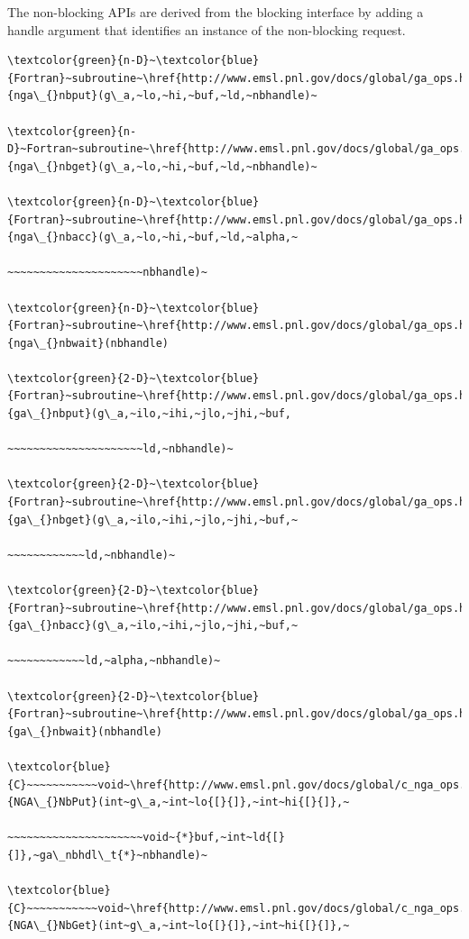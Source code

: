 The non-blocking APIs are derived from the blocking interface by adding
a handle argument that identifies an instance of the non-blocking
request.
\begin{verbatim}
\textcolor{green}{n-D}~\textcolor{blue}{Fortran}~subroutine~\href{http://www.emsl.pnl.gov/docs/global/ga_ops.html\#nga_nbput}{nga\_{}nbput}(g\_a,~lo,~hi,~buf,~ld,~nbhandle)~

\textcolor{green}{n-D}~Fortran~subroutine~\href{http://www.emsl.pnl.gov/docs/global/ga_ops.html\#nga_nbget}{nga\_{}nbget}(g\_a,~lo,~hi,~buf,~ld,~nbhandle)~

\textcolor{green}{n-D}~\textcolor{blue}{Fortran}~subroutine~\href{http://www.emsl.pnl.gov/docs/global/ga_ops.html\#nga_nbacc}{nga\_{}nbacc}(g\_a,~lo,~hi,~buf,~ld,~alpha,~

~~~~~~~~~~~~~~~~~~~~~nbhandle)~

\textcolor{green}{n-D}~\textcolor{blue}{Fortran}~subroutine~\href{http://www.emsl.pnl.gov/docs/global/ga_ops.html\#nga_nbwait}{nga\_{}nbwait}(nbhandle)

\textcolor{green}{2-D}~\textcolor{blue}{Fortran}~subroutine~\href{http://www.emsl.pnl.gov/docs/global/ga_ops.html\#ga_nbput}{ga\_{}nbput}(g\_a,~ilo,~ihi,~jlo,~jhi,~buf,

~~~~~~~~~~~~~~~~~~~~~ld,~nbhandle)~

\textcolor{green}{2-D}~\textcolor{blue}{Fortran}~subroutine~\href{http://www.emsl.pnl.gov/docs/global/ga_ops.html\#ga_nbget}{ga\_{}nbget}(g\_a,~ilo,~ihi,~jlo,~jhi,~buf,~

~~~~~~~~~~~~ld,~nbhandle)~

\textcolor{green}{2-D}~\textcolor{blue}{Fortran}~subroutine~\href{http://www.emsl.pnl.gov/docs/global/ga_ops.html\#ga_nbacc}{ga\_{}nbacc}(g\_a,~ilo,~ihi,~jlo,~jhi,~buf,~

~~~~~~~~~~~~ld,~alpha,~nbhandle)~

\textcolor{green}{2-D}~\textcolor{blue}{Fortran}~subroutine~\href{http://www.emsl.pnl.gov/docs/global/ga_ops.html\#ga_nbwait}{ga\_{}nbwait}(nbhandle)

\textcolor{blue}{C}~~~~~~~~~~~void~\href{http://www.emsl.pnl.gov/docs/global/c_nga_ops.html\#ga_nbput}{NGA\_{}NbPut}(int~g\_a,~int~lo{[}{]},~int~hi{[}{]},~

~~~~~~~~~~~~~~~~~~~~~void~{*}buf,~int~ld{[}{]},~ga\_nbhdl\_t{*}~nbhandle)~

\textcolor{blue}{C}~~~~~~~~~~~void~\href{http://www.emsl.pnl.gov/docs/global/c_nga_ops.html\#ga_nbget}{NGA\_{}NbGet}(int~g\_a,~int~lo{[}{]},~int~hi{[}{]},~


\end{verbatim}
